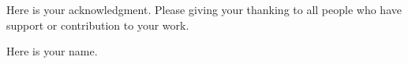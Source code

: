 \section*{}
Here is your acknowledgment.
Please giving your thanking to all people who have support or contribution to your work.


\begin{flushright}
Here is your name.
\end{flushright}

